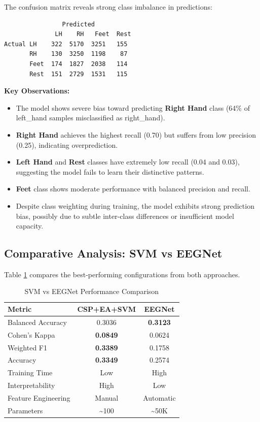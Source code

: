 \documentclass[conference]{IEEEtran}
\begin{document}
The confusion matrix reveals strong class imbalance in predictions:

\begin{verbatim}
                Predicted
              LH    RH   Feet  Rest
Actual LH    322  5170  3251   155
       RH    130  3250  1198    87
       Feet  174  1827  2038   114
       Rest  151  2729  1531   115
\end{verbatim}

\textbf{Key Observations:}
\begin{itemize}
    \item The model shows severe bias toward predicting \textbf{Right Hand} class (64\% of left\_hand samples misclassified as right\_hand).
    
    \item \textbf{Right Hand} achieves the highest recall (0.70) but suffers from low precision (0.25), indicating overprediction.
    
    \item \textbf{Left Hand} and \textbf{Rest} classes have extremely low recall (0.04 and 0.03), suggesting the model fails to learn their distinctive patterns.
    
    \item \textbf{Feet} class shows moderate performance with balanced precision and recall.
    
    \item Despite class weighting during training, the model exhibits strong prediction bias, possibly due to subtle inter-class differences or insufficient model capacity.
\end{itemize}

\subsection{Comparative Analysis: SVM vs EEGNet}

Table \ref{tab:comparison} compares the best-performing configurations from both approaches.

\begin{table}[htbp]
\centering
\caption{SVM vs EEGNet Performance Comparison}
\label{tab:comparison}
\begin{tabular}{lcc}
\toprule
\textbf{Metric} & \textbf{CSP+EA+SVM} & \textbf{EEGNet} \\
\midrule
Balanced Accuracy & 0.3036 & \textbf{0.3123} \\
Cohen's Kappa & \textbf{0.0849} & 0.0624 \\
Weighted F1 & \textbf{0.3389} & 0.1758 \\
Accuracy & \textbf{0.3349} & 0.2574 \\
Training Time & Low & High \\
Interpretability & High & Low \\
Feature Engineering & Manual & Automatic \\
Parameters & \textasciitilde100 & \textasciitilde50K \\
\bottomrule
\end{tabular}
\end{table}
\end{document}
